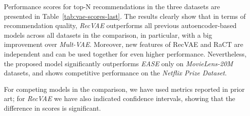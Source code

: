 \documentclass[sigconf,authorversion]{acmart}
\begin{document}
Performance scores for top-N recommendations in the three datasets are presented in Table~\ref{tab:vae-scores-last}. The results clearly show that in terms of recommendation quality, \emph{RecVAE} outperforms all previous autoencoder-based models across all datasets in the comparison, in particular, with a big improvement over \emph{Mult-VAE}. Moreover, new features of RecVAE and RaCT are independent and can be used together for even higher performance. Nevertheless, the proposed model significantly outperforms \emph{EASE} only on \emph{MovieLens-20M} datasets, and shows competitive performance on the \emph{Netflix Prize Dataset}.

For competing models in the comparison, we have used metrics reported in prior art; for \emph{RecVAE} we have also indicated confidence intervals, showing that the difference in scores is significant.
\end{document}
